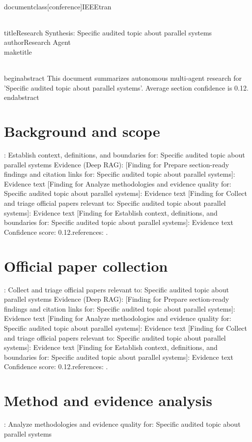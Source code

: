 \\documentclass[conference]{IEEEtran}
\begin{document}
\\titleResearch Synthesis: Specific audited topic about parallel systems
\\authorResearch Agent
\\maketitle

\\begin{abstract}
This document summarizes autonomous multi-agent research for 'Specific audited topic about parallel systems'. Average section confidence is 0.12.
\\end{abstract}

\section{Background and scope}\nObjective: Establish context, definitions, and boundaries for: Specific audited topic about parallel systems
Evidence (Deep RAG):
[Finding for Prepare section-ready findings and citation links for: Specific audited topic about parallel systems]: Evidence text
[Finding for Analyze methodologies and evidence quality for: Specific audited topic about parallel systems]: Evidence text
[Finding for Collect and triage official papers relevant to: Specific audited topic about parallel systems]: Evidence text
[Finding for Establish context, definitions, and boundaries for: Specific audited topic about parallel systems]: Evidence text
Confidence score: 0.12.\nSupporting references: \cite{t1_mock_1,t2_mock_1,t3_mock_1,t4_mock_1}.\n\n\section{Official paper collection}\nObjective: Collect and triage official papers relevant to: Specific audited topic about parallel systems
Evidence (Deep RAG):
[Finding for Prepare section-ready findings and citation links for: Specific audited topic about parallel systems]: Evidence text
[Finding for Analyze methodologies and evidence quality for: Specific audited topic about parallel systems]: Evidence text
[Finding for Collect and triage official papers relevant to: Specific audited topic about parallel systems]: Evidence text
[Finding for Establish context, definitions, and boundaries for: Specific audited topic about parallel systems]: Evidence text
Confidence score: 0.12.\nSupporting references: \cite{t1_mock_1,t2_mock_1,t3_mock_1,t4_mock_1}.\n\n\section{Method and evidence analysis}\nObjective: Analyze methodologies and evidence quality for: Specific audited topic about parallel systems
\end{document}
